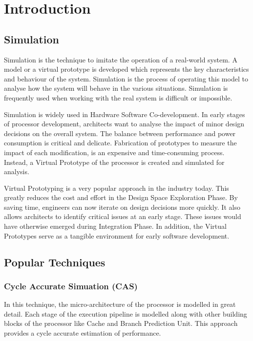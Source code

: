 \chapter{Introduction}\label{chapter:introduction}

\section{Simulation}

Simulation is the technique to imitate the operation of a real-world system. 
A model or a virtual prototype is developed which represents the key characteristics and behaviour of the system. Simulation is the process of operating this model to analyse how the system will behave in the various situations. Simulation is frequently used when working with the real system is difficult or impossible.

Simulation is widely used in Hardware Software Co-development. In early stages of processor development, architects want to analyse the impact of minor design decisions on the overall system. The balance between performance and power consumption is critical and delicate. Fabrication of prototypes to measure the impact of each modification, is an expensive and time-consuming process. Instead, a Virtual Prototype of the processor is created and simulated for analysis.

Virtual Prototyping is a very popular approach in the industry today. This greatly reduces the cost and effort in the Design Space Exploration Phase. By saving time, engineers can now iterate on design decisions more quickly. It also allows architects to identify critical issues at an early stage. These issues would have otherwise emerged during Integration Phase. In addition, the Virtual Prototypes serve as a tangible environment for early software development.

\section{Popular Techniques}

\subsection{Cycle Accurate Simuation (CAS)}
In this technique, the micro-architecture of the processor is modelled in great detail. Each stage of the execution pipeline is modelled along with other building blocks of the processor like Cache and Branch Prediction Unit. This approach provides a cycle accurate estimation of performance.

